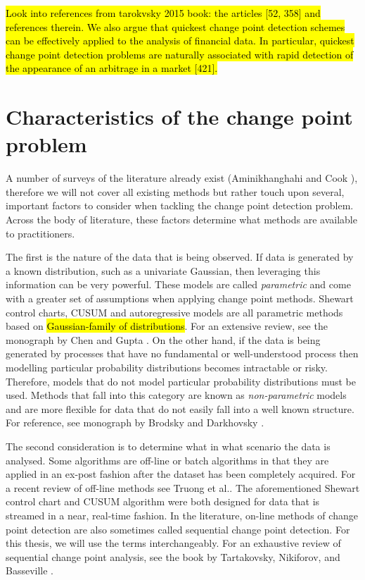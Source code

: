 \hl{Look into references from tarokvsky 2015 book:  the articles [52, 358] and references therein.
We also argue that quickest change point detection schemes can be effectively applied to the
analysis of financial data. In particular, quickest change point detection problems are naturally associated with rapid detection of the appearance of an arbitrage in a market [421].}

\section{Characteristics of the change point problem}
A number of surveys of the literature already exist (Aminikhanghahi and Cook \cite{aminikhanghahi2017survey}), therefore we will not cover all existing methods but rather touch upon several, important factors to consider when tackling the change point detection problem. Across the body of literature, these factors determine what methods are available to practitioners. %

The first is the nature of the data that is being observed. If data is generated by a known distribution, such as a univariate Gaussian, then leveraging this information can be very powerful. These models are called \textit{parametric} and come with a greater set of assumptions when applying change point methods. Shewart control charts, CUSUM and autoregressive models are all parametric methods based on \hl{Gaussian-family of distributions}. For an extensive review, see the monograph by Chen and Gupta \cite{chen2011parametric}. On the other hand, if the data is being generated by processes that have no fundamental or well-understood process then modelling particular probability distributions becomes intractable or risky. Therefore, models that do not model particular probability distributions must be used. Methods that fall into this category are known as \textit{non-parametric} models and are more flexible for data that do not easily fall into a well known structure. For reference, see monograph by Brodsky and Darkhovsky \cite{brodsky2013nonparametric}. %

The second consideration is to determine what in what scenario the data is analysed. Some algorithms are off-line or batch algorithms in that they are applied in an ex-post fashion after the dataset has been completely acquired. For a recent review of off-line methods see Truong et al.\cite{truong2018review}. The aforementioned Shewart control chart and CUSUM algorithm were both designed for data that is streamed in a near, real-time fashion. In the literature, on-line methods of change point detection are also sometimes called sequential change point detection. For this thesis, we will use the terms interchangeably. For an exhaustive review of sequential change point analysis, see the book by Tartakovsky, Nikiforov, and Basseville  \cite{tartakovsky2014sequential}. %

